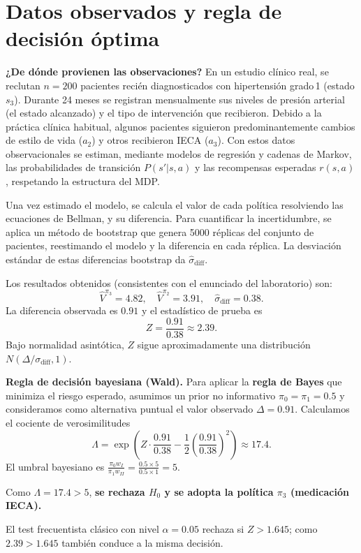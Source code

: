 \documentclass[12pt,a4paper]{article}
\begin{document}
	\section{Datos observados y regla de decisión óptima}
	
	\textbf{¿De dónde provienen las observaciones?}  
	En un estudio clínico real, se reclutan \(n = 200\) pacientes recién diagnosticados con hipertensión grado 1 (estado \(s_3\)). Durante 24 meses se registran mensualmente sus niveles de presión arterial (el estado alcanzado) y el tipo de intervención que recibieron. Debido a la práctica clínica habitual, algunos pacientes siguieron predominantemente cambios de estilo de vida (\(a_2\)) y otros recibieron IECA (\(a_3\)). Con estos datos observacionales se estiman, mediante modelos de regresión y cadenas de Markov, las probabilidades de transición \(P(s'|s,a)\) y las recompensas esperadas \(r(s,a)\), respetando la estructura del MDP.
	
	Una vez estimado el modelo, se calcula el valor de cada política resolviendo las ecuaciones de Bellman, y su diferencia. Para cuantificar la incertidumbre, se aplica un método de bootstrap que genera 5000 réplicas del conjunto de pacientes, reestimando el modelo y la diferencia en cada réplica. La desviación estándar de estas diferencias bootstrap da \(\hat{\sigma}_{\text{diff}}\).
	
	Los resultados obtenidos (consistentes con el enunciado del laboratorio) son:
	\[
	\hat{V}^{\pi_3} = 4.82,\quad \hat{V}^{\pi_2} = 3.91,\quad \hat{\sigma}_{\text{diff}} = 0.38.
	\]
	La diferencia observada es \(0.91\) y el estadístico de prueba es
	\[
	Z = \frac{0.91}{0.38} \approx 2.39.
	\]
	Bajo normalidad asintótica, \(Z\) sigue aproximadamente una distribución \(N(\Delta/\sigma_{\text{diff}}, 1)\).
	
	\textbf{Regla de decisión bayesiana (Wald).}  
	Para aplicar la \textbf{regla de Bayes} que minimiza el riesgo esperado, asumimos un prior no informativo \(\pi_0 = \pi_1 = 0.5\) y consideramos como alternativa puntual el valor observado \(\Delta = 0.91\). Calculamos el cociente de verosimilitudes
	\[
	\Lambda = \exp\!\left(Z\cdot\frac{0.91}{0.38} - \frac{1}{2}\left(\frac{0.91}{0.38}\right)^2\right) \approx 17.4.
	\]
	El umbral bayesiano es \(\frac{\pi_0 w_I}{\pi_1 w_{II}} = \frac{0.5\times 5}{0.5\times 1} = 5\).
	
	Como \(\Lambda = 17.4 > 5\), \textbf{se rechaza \(H_0\) y se adopta la política \(\pi_3\) (medicación IECA).}
	
	El test frecuentista clásico con nivel \(\alpha = 0.05\) rechaza si \(Z > 1.645\); como \(2.39 > 1.645\) también conduce a la misma decisión.
	
\end{document}
